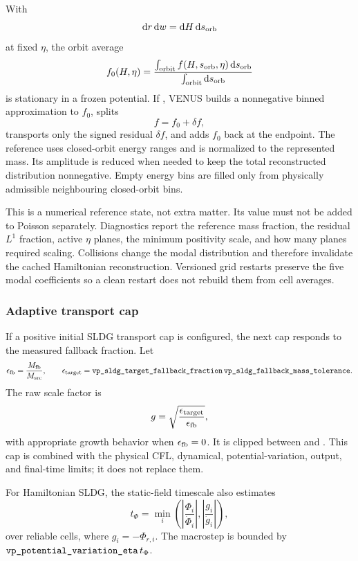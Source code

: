 With
\[
 \mathrm d r\,\mathrm d w=\mathrm d H\,\mathrm d s_{\rm orb}
\]
at fixed \(\eta\), the orbit average
\[
 f_0(H,\eta)
 =\frac{\int_{\rm orbit}f(H,s_{\rm orb},\eta)\,\mathrm d s_{\rm orb}}
        {\int_{\rm orbit}\mathrm d s_{\rm orb}}
\]
is stationary in a frozen potential.  If
, VENUS builds a nonnegative
binned approximation to \(f_0\), splits
\[
 f=f_0+\delta f,
\]
transports only the signed residual \(\delta f\), and adds \(f_0\) back at the
endpoint.  The reference uses closed-orbit energy ranges and is normalized to the
represented mass. Its amplitude is reduced when needed to keep the total
reconstructed distribution nonnegative.  Empty energy bins are filled only from
physically admissible neighbouring closed-orbit bins.

This is a numerical reference state, not extra matter.  Its value must not be
added to Poisson separately.  Diagnostics report the reference mass fraction,
the residual \(L^1\) fraction, active \(\eta\) planes, the minimum positivity
scale, and how many planes required scaling.  Collisions change the modal
distribution and therefore invalidate the cached Hamiltonian reconstruction.
Versioned grid restarts preserve the five modal coefficients so a clean
restart does not rebuild them from cell averages.

\subsubsection{Adaptive transport cap}

If a positive initial SLDG transport cap is configured, the next cap responds
to the measured fallback fraction.  Let
\[
 \epsilon_{\rm fb}=\frac{M_{\rm fb}}{M_{\rm src}},
 \qquad
 \epsilon_{\rm target}
 =\code{vp_sldg_target_fallback_fraction}\,
  \code{vp_sldg_fallback_mass_tolerance}.
\]
The raw scale factor is
\[
 g=\sqrt{\frac{\epsilon_{\rm target}}{\epsilon_{\rm fb}}},
\]
with appropriate growth behavior when \(\epsilon_{\rm fb}=0\).  It is clipped
between  and
.  This cap is combined with the physical CFL,
dynamical, potential-variation, output, and final-time limits; it does not
replace them.

For Hamiltonian SLDG, the static-field timescale also estimates
\[
 t_\Phi=\min_i\left(
 \left|\frac{\Phi_i}{\dot\Phi_i}\right|,
 \left|\frac{g_i}{\dot g_i}\right|
 \right),
\]
over reliable cells, where \(g_i=-\Phi_{r,i}\).  The macrostep is bounded by
\(\code{vp_potential_variation_eta}\,t_\Phi\).

